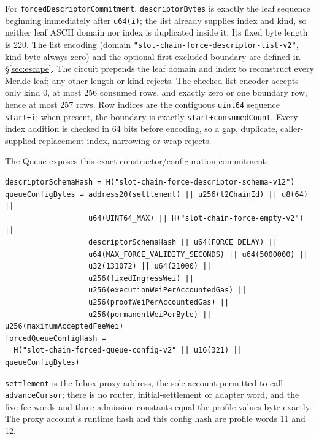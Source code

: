 \documentclass[a4paper,11pt]{article}
\newcommand{\code}[1]{\nolinkurl{#1}}
\begin{document}
For \code{forcedDescriptorCommitment}, \code{descriptorBytes} is exactly the
leaf sequence beginning immediately after \code{u64(i)}; the list already
supplies index and kind, so neither leaf ASCII domain nor index is duplicated
inside it.  Its fixed byte length is 220.  The list encoding (domain
\code{"slot-chain-force-descriptor-list-v2"}, kind byte always zero) and the
optional first excluded boundary are defined in \S\ref{sec:escape}.  The
circuit prepends the leaf domain and index to reconstruct every Merkle leaf;
any other length or kind rejects.  The checked list encoder accepts only kind
0, at most 256 consumed rows, and exactly zero or one boundary row, hence at
most 257 rows.  Row indices are the contiguous \code{uint64} sequence
\code{start+i}; when present, the boundary is exactly
\code{start+consumedCount}.  Every index addition is checked in 64 bits before
encoding, so a gap, duplicate, caller-supplied replacement index, narrowing or
wrap rejects.

The Queue exposes this exact constructor/configuration commitment:
\begin{verbatim}
descriptorSchemaHash = H("slot-chain-force-descriptor-schema-v12")
queueConfigBytes = address20(settlement) || u256(l2ChainId) || u8(64) ||
                   u64(UINT64_MAX) || H("slot-chain-force-empty-v2") ||
                   descriptorSchemaHash || u64(FORCE_DELAY) ||
                   u64(MAX_FORCE_VALIDITY_SECONDS) || u64(5000000) ||
                   u32(131072) || u64(21000) ||
                   u256(fixedIngressWei) ||
                   u256(executionWeiPerAccountedGas) ||
                   u256(proofWeiPerAccountedGas) ||
                   u256(permanentWeiPerByte) || u256(maximumAcceptedFeeWei)
forcedQueueConfigHash =
  H("slot-chain-forced-queue-config-v2" || u16(321) || queueConfigBytes)
\end{verbatim}
\code{settlement} is the Inbox proxy address, the sole account permitted to
call \code{advanceCursor}; there is no router, initial-settlement or adapter
word, and the five fee words and three admission constants equal the profile
values byte-exactly.  The proxy account's runtime hash and this config hash are
profile words 11 and 12.
\end{document}
